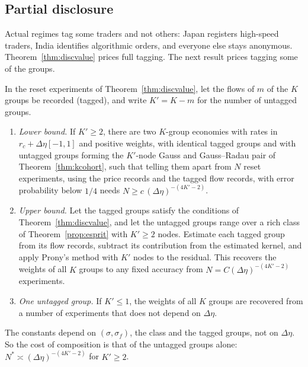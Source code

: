 \subsection{Partial disclosure}\label{sec:partial}

Actual regimes tag some traders and not others: Japan registers high-speed traders, India identifies algorithmic orders, and everyone else stays anonymous. Theorem~\ref{thm:discvalue} prices full tagging. The next result prices tagging some of the groups.

\begin{theorem}\label{thm:partial}
In the reset experiments of Theorem~\ref{thm:discvalue}, let the flows of $m$ of the $K$ groups be recorded (tagged), and write $K'=K-m$ for the number of untagged groups.
\begin{enumerate}[label=(\roman*),itemsep=1pt]
\item \emph{Lower bound.} If $K'\ge2$, there are two $K$-group economies with rates in $r_c+\Delta\eta[-1,1]$ and positive weights, with identical tagged groups and with untagged groups forming the $K'$-node Gauss and Gauss--Radau pair of Theorem~\ref{thm:kcohort}, such that telling them apart from $N$ reset experiments, using the price records and the tagged flow records, with error probability below $1/4$ needs $N\ge c\,(\Delta\eta)^{-(4K'-2)}$.
\item \emph{Upper bound.} Let the tagged groups satisfy the conditions of Theorem~\ref{thm:discvalue}, and let the untagged groups range over a rich class of Theorem~\ref{prop:esprit} with $K'\ge2$ nodes. Estimate each tagged group from its flow records, subtract its contribution from the estimated kernel, and apply Prony's method with $K'$ nodes to the residual. This recovers the weights of all $K$ groups to any fixed accuracy from $N=C(\Delta\eta)^{-(4K'-2)}$ experiments.
\item \emph{One untagged group.} If $K'\le1$, the weights of all $K$ groups are recovered from a number of experiments that does not depend on $\Delta\eta$.
\end{enumerate}
The constants depend on $(\sigma,\sigma_f)$, the class and the tagged groups, not on $\Delta\eta$. So the cost of composition is that of the untagged groups alone: $N^*\asymp(\Delta\eta)^{-(4K'-2)}$ for $K'\ge2$.
\end{theorem}

